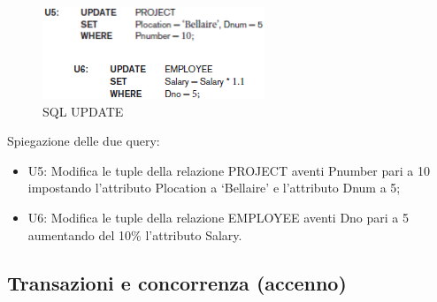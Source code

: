\begin{itemize}
\begin{center}
\begin{figure}[H]
\centering
\includegraphics[scale=1]{figures/update.png}
\caption{SQL UPDATE} 
\end{figure}
\end{center}

Spiegazione delle due query:

\begin{itemize}

\item{U5}: Modifica le tuple della relazione PROJECT aventi Pnumber pari a 10 impostando l’attributo Plocation a ‘Bellaire’ e l’attributo Dnum a 5;
\item{U6}: Modifica le tuple della relazione EMPLOYEE aventi Dno pari a 5 aumentando del 10\% l’attributo Salary.

\end{itemize}

\end{itemize}


\subsection{Transazioni e concorrenza (accenno)}

